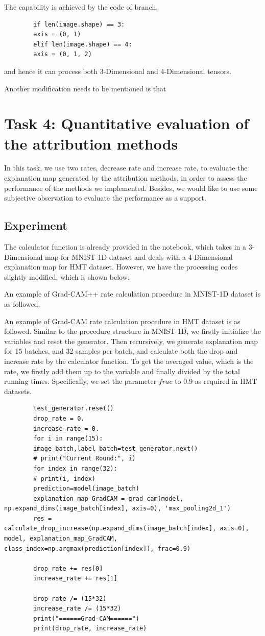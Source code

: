 \documentclass[conference]{IEEEtran}
\begin{document}
	The capability is achieved by the code of branch,
	\begin{lstlisting}
		if len(image.shape) == 3:
		axis = (0, 1)
		elif len(image.shape) == 4:
		axis = (0, 1, 2)
	\end{lstlisting}
	and hence it can process both 3-Dimensional and 4-Dimensional tensors.
	
	Another modification needs to be mentioned is that
	
	
	\section{Task 4: Quantitative evaluation of the attribution methods}
	
	In this task, we use two rates, decrease rate and increase rate, to evaluate the explanation map generated by the attribution methods, in order to assess the performance of the methods we implemented. Besides, we would like to use some subjective observation to evaluate the performance as a support.
	
	\subsection {Experiment}
	
	The calculator function is already provided in the notebook, which takes in a 3-Dimensional map for MNIST-1D dataset and deals with a 4-Dimensional explanation map for HMT dataset. However, we have the processing codes slightly modified, which is shown below.
	
	An example of Grad-CAM++ rate calculation procedure in MNIST-1D dataset is as followed.
	
	
	An example of Grad-CAM rate calculation procedure in HMT dataset is as followed. Similar to the procedure structure in MNIST-1D, we firstly initialize the variables and reset the generator. Then recursively, we generate explanation map for 15 batches, and 32 samples per batch, and calculate both the drop and increase rate by the calculator function. To get the averaged value, which is the rate, we firstly add them up to the variable and finally divided by the total running times. Specifically, we set the parameter $frac$ to 0.9 as required in HMT datasets.
	
	\begin{lstlisting}
		test_generator.reset()
		drop_rate = 0.
		increase_rate = 0.
		for i in range(15):
		image_batch,label_batch=test_generator.next()
		# print("Current Round:", i)
		for index in range(32):
		# print(i, index)
		prediction=model(image_batch)
		explanation_map_GradCAM = grad_cam(model, np.expand_dims(image_batch[index], axis=0), 'max_pooling2d_1')
		res = calculate_drop_increase(np.expand_dims(image_batch[index], axis=0), model, explanation_map_GradCAM, class_index=np.argmax(prediction[index]), frac=0.9)
		
		drop_rate += res[0]
		increase_rate += res[1]
		
		drop_rate /= (15*32)
		increase_rate /= (15*32)
		print("======Grad-CAM======")
		print(drop_rate, increase_rate)
	\end{lstlisting}
	
\end{document}
